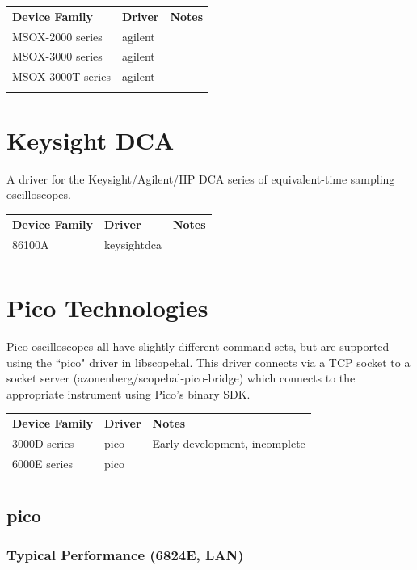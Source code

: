 \begin{tabularx}{16cm}{llX}
\thickhline
\textbf{Device Family} & \textbf{Driver} & \textbf{Notes} \\
\thickhline
MSOX-2000 series & agilent &  \\
\thickhline
MSOX-3000 series & agilent &  \\
\thickhline
MSOX-3000T series & agilent &  \\
\thickhline
\end{tabularx}

\section{Keysight DCA}

A driver for the Keysight/Agilent/HP DCA series of equivalent-time sampling oscilloscopes.

\begin{tabularx}{16cm}{llX}
\thickhline
\textbf{Device Family} & \textbf{Driver} & \textbf{Notes} \\
\thickhline
86100A & keysightdca &  \\
\thickhline
\end{tabularx}

\section{Pico Technologies}

Pico oscilloscopes all have slightly different command sets, but are supported using the ``pico" driver in libscopehal.
This driver connects via a TCP socket to a socket server (azonenberg/scopehal-pico-bridge) which connects to the
appropriate instrument using Pico's binary SDK.

\begin{tabularx}{16cm}{llX}
\thickhline
\textbf{Device Family} & \textbf{Driver} & \textbf{Notes} \\
\thickhline
3000D series & pico & Early development, incomplete\\
\thinhline
6000E series & pico & \\
\thickhline
\end{tabularx}

\subsection{pico}

\subsubsection{Typical Performance (6824E, LAN)}

